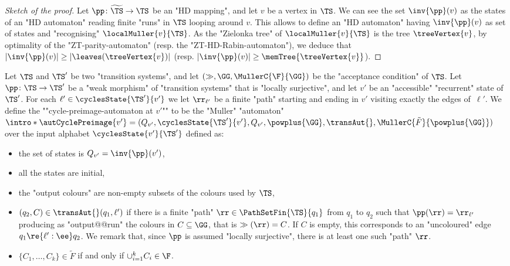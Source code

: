 \documentclass{theoretics}
\begin{document}
\begin{proof}[Sketch of the proof]
	Let $\pp\colon \widetilde{\TS}\to \TS$ be an "HD mapping", and let $v$ be a vertex in $\TS$. We can see the set $\inv{\pp}(v)$ as the states of an "HD automaton" reading finite "runs" in $\TS$ looping around $v$. This allows to define an "HD automaton" having $\inv{\pp}(v)$ as set of states and "recognising" $\localMuller{v}{\TS}$. As the "Zielonka tree" of $\localMuller{v}{\TS}$ is the tree $\treeVertex{v}$, by optimality of the "ZT-parity-automaton" (resp. the "ZT-HD-Rabin-automaton"), we deduce that $|\inv{\pp}(v)|\geq |\leaves(\treeVertex{v})|$ (resp. $|\inv{\pp}(v)|\geq \memTree{\treeVertex{v}}$).
\end{proof}

\begin{definition}\label{def:cycle-preimage-automaton}
	Let $\TS$ and $\TS'$ be two "transition systems", and let $(\gg, \GG, \MullerC{\F}{\GG})$ be the "acceptance condition" of $\TS$.
	Let $\pp \colon \TS \to \TS'$ be a "weak morphism" of  "transition systems" that is "locally surjective", and let $v'$ be an "accessible" "recurrent" state of $\TS'$. 
	For each $\ell' \in \cyclesState{\TS'}{v'}$ we let $\rr_{\ell'}$ be a finite "path" starting and ending in $v'$ visiting exactly the edges of~$\ell'$.
	\AP We define the ""cycle-preimage-automaton at $v'$"" to be the "Muller" "automaton" $\intro*\autCyclePreimage{v'} = (Q_{v'}, \cyclesState{\TS'}{v'}, Q_{v'}, \powplus{\GG}, \transAut{}, \MullerC{\tilde{F}}{\powplus{\GG}})$ over the input alphabet $\cyclesState{v'}{\TS'}$ defined as:
	\begin{itemize}
		\item the set of states is $Q_{v'} = \inv{\pp}(v')$,
		\item all the states are initial,
		\item the "output colours" are non-empty subsets of the colours used by $\TS$,
		\item $(q_2, C)\in \transAut{}(q_1,\ell')$  if there is a finite "path" $\rr \in \PathSetFin{\TS}{q_1}$ from $q_1$ to $q_2$ such that $\pp(\rr) = \rr_{\ell'}$ producing as "output@@run" the colours in $C\subseteq \GG$, that is $\gg(\rr) = C$. If $C$ is empty, this corresponds to an "uncoloured" edge $q_1\re{\ell':\ee}q_2$.
		We remark that, since $\pp$ is assumed "locally surjective", there is at least one such "path" $\rr$.
		\item $\{C_1,\dots, C_k\} \in \tilde{F}$ if and only if $\cup_{i=1}^k C_i \in \F$.
	\end{itemize}
\end{definition}
\end{document}
